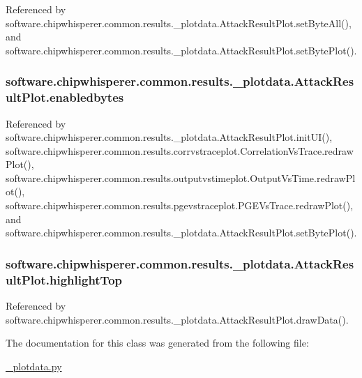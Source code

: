 Referenced by software.\+chipwhisperer.\+common.\+results.\+\_\+plotdata.\+Attack\+Result\+Plot.\+set\+Byte\+All(), and software.\+chipwhisperer.\+common.\+results.\+\_\+plotdata.\+Attack\+Result\+Plot.\+set\+Byte\+Plot().

\hypertarget{classsoftware_1_1chipwhisperer_1_1common_1_1results_1_1__plotdata_1_1AttackResultPlot_ac0d4e92a773fb657a496c5a1fc512546}{}
\subsubsection[{enabledbytes}]{\setlength{\rightskip}{0pt plus 5cm}software.\+chipwhisperer.\+common.\+results.\+\_\+plotdata.\+Attack\+Result\+Plot.\+enabledbytes}\label{classsoftware_1_1chipwhisperer_1_1common_1_1results_1_1__plotdata_1_1AttackResultPlot_ac0d4e92a773fb657a496c5a1fc512546}


Referenced by software.\+chipwhisperer.\+common.\+results.\+\_\+plotdata.\+Attack\+Result\+Plot.\+init\+U\+I(), software.\+chipwhisperer.\+common.\+results.\+corrvstraceplot.\+Correlation\+Vs\+Trace.\+redraw\+Plot(), software.\+chipwhisperer.\+common.\+results.\+outputvstimeplot.\+Output\+Vs\+Time.\+redraw\+Plot(), software.\+chipwhisperer.\+common.\+results.\+pgevstraceplot.\+P\+G\+E\+Vs\+Trace.\+redraw\+Plot(), and software.\+chipwhisperer.\+common.\+results.\+\_\+plotdata.\+Attack\+Result\+Plot.\+set\+Byte\+Plot().

\hypertarget{classsoftware_1_1chipwhisperer_1_1common_1_1results_1_1__plotdata_1_1AttackResultPlot_af92b8a374c600cd3e8c5cf55118dccff}{}
\subsubsection[{highlight\+Top}]{\setlength{\rightskip}{0pt plus 5cm}software.\+chipwhisperer.\+common.\+results.\+\_\+plotdata.\+Attack\+Result\+Plot.\+highlight\+Top}\label{classsoftware_1_1chipwhisperer_1_1common_1_1results_1_1__plotdata_1_1AttackResultPlot_af92b8a374c600cd3e8c5cf55118dccff}


Referenced by software.\+chipwhisperer.\+common.\+results.\+\_\+plotdata.\+Attack\+Result\+Plot.\+draw\+Data().



The documentation for this class was generated from the following file\+:\begin{DoxyCompactItemize}
\item 
\hyperlink{__plotdata_8py}{\+\_\+plotdata.\+py}\end{DoxyCompactItemize}
